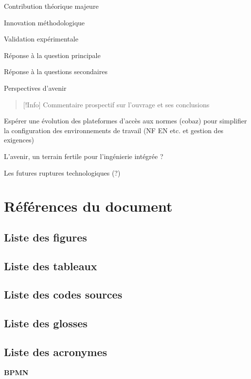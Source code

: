 \documentclass[a4paper,12pt]{article}
\begin{document}
Contribution théorique majeure

Innovation méthodologique

Validation expérimentale

Réponse à la question principale

Réponse à la questions secondaires

Perspectives d'avenir


\begin{quote}
{[}!Info] Commentaire prospectif sur l'ouvrage et ses conclusions
\end{quote}

Espérer une évolution des plateformes d'accès aux normes (cobaz) pour simplifier la configuration des environnements de travail (NF EN etc. et gestion des exigences)

L'avenir, un terrain fertile pour l'ingénierie intégrée ?

Les futures ruptures technologiques (?)
\clearpage
\section{Références du document}
\label{sec:org01ed123}
\subsection{Liste des figures}
\label{sec:org5f4b181}
\renewcommand{\listfigurename}{\vspace{-2em}}
\listoffigures
\subsection{Liste des tableaux}
\label{sec:org9844751}
\renewcommand{\listtablename}{\vspace{-2em}}
\listoftables
\subsection{Liste des codes sources}
\label{sec:org707862c}
\renewcommand{\lstlistingname}{\vspace{-2em}}
\lstlistoflistings
\subsection{Liste des glosses}
\label{sec:orgabc2c94}


\subsection{Liste des acronymes}
\label{sec:org3b13804}
\textbf{\hypertarget{gls-79}{BPMN}}\hspace*{1em}\hspace*{.5em}\pageref{gls-4-use-1}
\end{document}
